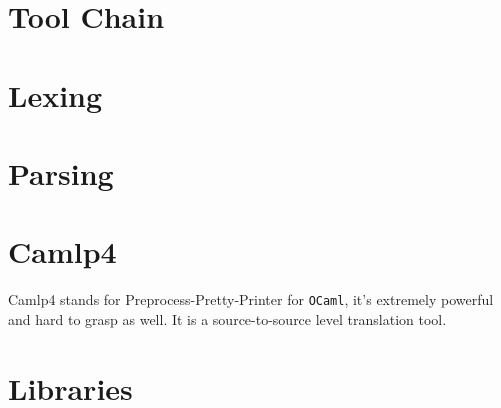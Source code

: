 \documentclass[svgnames,12pt,a4paper]{book}
\begin{document}
\newpage

\tableofcontents
\listoftodos
\vspace*{1cm}

\newpage
\newpage 
\chapter{Tool Chain}
 
















\chapter{Lexing}



\chapter{Parsing}
\label{sec:ocamlyacc}



\chapter{Camlp4}
\label{sec:camlp4}
Camlp4 stands for Preprocess-Pretty-Printer for \verb|OCaml|, it's
extremely powerful and  hard to grasp as well. It is a
source-to-source level translation tool.
  
  
  
  
  
  
  
  
  
  

  
  
  
  
  
\chapter{Libraries}
  
  

  
  
  
  
  
  
  
\end{document}

